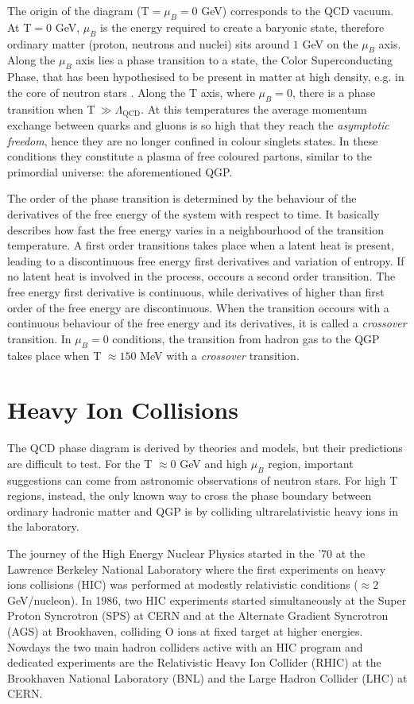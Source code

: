 The origin of the diagram (T$=\mu_{B}=0$ GeV) corresponds to the QCD vacuum. At T$=0$ GeV, $\mu_{B}$ is 
the energy required to create a baryonic state, therefore ordinary matter (proton, neutrons and nuclei)
sits around $1$ GeV on the $\mu_{B}$ axis. Along the $\mu_{B}$ axis lies a phase transition to a state,
the Color Superconducting Phase, that has been hypothesised to be present in matter at high density,
e.g. in  the core of neutron stars \cite{csp}.
Along the T axis, where $\mu_{B}=0$, there is a phase transition when T$\ \gg \Lambda_{\mathrm{QCD}}$. 
At this temperatures the average momentum exchange between quarks and gluons is so high that they reach
the \textit{asymptotic freedom}, hence they are no longer confined in colour singlets states.
In these conditions they constitute a plasma of free coloured partons, similar to the primordial 
universe: the aforementioned QGP.

The order of the phase transition is determined by the behaviour of the derivatives of the free energy
of the system with respect to time. It basically describes how fast the free energy varies in a 
neighbourhood of the transition temperature.
A first order transitions takes place when a latent heat is present, leading to a discontinuous free
energy first derivatives and variation of entropy.
If no latent heat is involved in the process, occours a second order transition. The free energy 
first derivative is continuous, while derivatives of higher than first order of the free energy are 
discontinuous.
When the transition occours with a continuous behaviour of the free energy and its derivatives,
it is called a \textit{crossover} transition.
In $\mu_{B}=0$ conditions, the transition from hadron gas to the QGP takes place when T $\approx 150$ MeV
with a \textit{crossover} transition.

%
%
\section{Heavy Ion Collisions}
\label{sec:1.3}

The QCD phase diagram is derived by theories and models, but their predictions are difficult to test.
For the T $\approx0$ GeV and high $\mu_{B}$ region, important suggestions can come from astronomic observations 
of neutron stars. 
For high T regions, instead, the only known way to cross the phase boundary between ordinary hadronic matter
and QGP is by colliding ultrarelativistic heavy ions in the laboratory.

The journey of the High Energy Nuclear Physics started in the '70 at the Lawrence Berkeley National Laboratory
where the first experiments on heavy ions collisions (HIC) was performed at modestly relativistic conditions 
($\approx 2\ $ GeV/nucleon).
In 1986, two HIC experiments started simultaneously at the Super Proton Syncrotron (SPS) at CERN and at the
Alternate Gradient Syncrotron (AGS) at Brookhaven, colliding O ions at fixed target at higher energies.
Nowdays the two main hadron colliders active with an HIC program and dedicated experiments are the
Relativistic Heavy Ion Collider (RHIC) at the Brookhaven National Laboratory (BNL) and the Large Hadron
Collider (LHC) at CERN.


